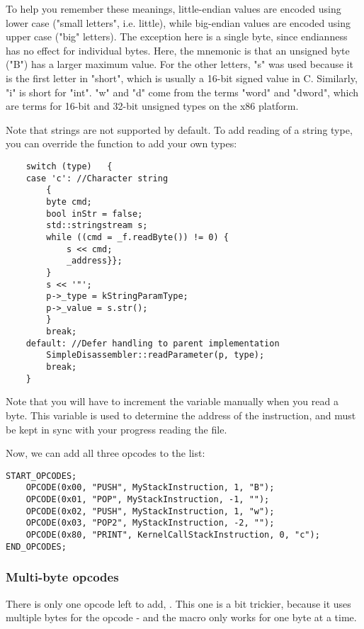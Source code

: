 To help you remember these meanings, little-endian values are encoded using lower case ("small letters", i.e. little), while big-endian values are encoded using upper case ("big" letters). The exception here is a single byte, since endianness has no effect for individual bytes. Here, the mnemonic is that an unsigned byte ("B") has a larger maximum value. For the other letters, "s" was used because it is the first letter in "short", which is usually a 16-bit signed value in C. Similarly, "i" is short for "int". "w" and "d" come from the terms "word" and "dword", which are terms for 16-bit and 32-bit unsigned types on the x86 platform.

Note that strings are not supported by default. To add reading of a string type, you can override the  function to add your own types:

\begin{C++}
\begin{lstlisting}
	switch (type)	{
	case 'c': //Character string
		{
		byte cmd;
		bool inStr = false;
		std::stringstream s;
		while ((cmd = _f.readByte()) != 0) {
			s << cmd;
			_address}};
		}
		s << '"';
		p->_type = kStringParamType;
		p->_value = s.str();
		}
		break;
	default: //Defer handling to parent implementation
		SimpleDisassembler::readParameter(p, type);
		break;
	}
\end{lstlisting}
\end{C++}

Note that you will have to increment the  variable manually when you read a byte. This variable is used to determine the address of the instruction, and must be kept in sync with your progress reading the file.

Now, we can add all three opcodes to the list:

\begin{C++}
\begin{lstlisting}
START_OPCODES;
	OPCODE(0x00, "PUSH", MyStackInstruction, 1, "B");
	OPCODE(0x01, "POP", MyStackInstruction, -1, "");
	OPCODE(0x02, "PUSH", MyStackInstruction, 1, "w");
	OPCODE(0x03, "POP2", MyStackInstruction, -2, "");
	OPCODE(0x80, "PRINT", KernelCallStackInstruction, 0, "c");
END_OPCODES;
\end{lstlisting}
\end{C++}

\subsubsection{Multi-byte opcodes}
There is only one opcode left to add, . This one is a bit trickier, because it uses multiple bytes for the opcode - and the  macro only works for one byte at a time.

